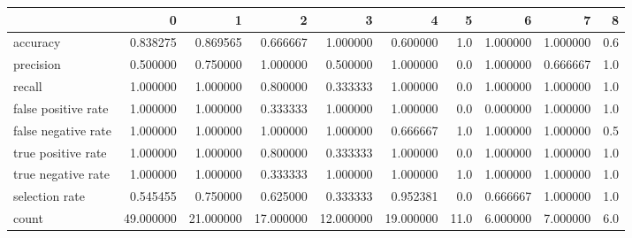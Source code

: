 \begin{tabular}{lrrrrrrrrr}
\toprule
{} &          0 &          1 &          2 &          3 &          4 &     5 &         6 &         7 &    8 \\
\midrule
accuracy            &   0.838275 &   0.869565 &   0.666667 &   1.000000 &   0.600000 &   1.0 &  1.000000 &  1.000000 &  0.6 \\
precision           &   0.500000 &   0.750000 &   1.000000 &   0.500000 &   1.000000 &   0.0 &  1.000000 &  0.666667 &  1.0 \\
recall              &   1.000000 &   1.000000 &   0.800000 &   0.333333 &   1.000000 &   0.0 &  1.000000 &  1.000000 &  1.0 \\
false positive rate &   1.000000 &   1.000000 &   0.333333 &   1.000000 &   1.000000 &   0.0 &  0.000000 &  1.000000 &  1.0 \\
false negative rate &   1.000000 &   1.000000 &   1.000000 &   1.000000 &   0.666667 &   1.0 &  1.000000 &  1.000000 &  0.5 \\
true positive rate  &   1.000000 &   1.000000 &   0.800000 &   0.333333 &   1.000000 &   0.0 &  1.000000 &  1.000000 &  1.0 \\
true negative rate  &   1.000000 &   1.000000 &   0.333333 &   1.000000 &   1.000000 &   1.0 &  1.000000 &  1.000000 &  1.0 \\
selection rate      &   0.545455 &   0.750000 &   0.625000 &   0.333333 &   0.952381 &   0.0 &  0.666667 &  1.000000 &  1.0 \\
count               &  49.000000 &  21.000000 &  17.000000 &  12.000000 &  19.000000 &  11.0 &  6.000000 &  7.000000 &  6.0 \\
\bottomrule
\end{tabular}
